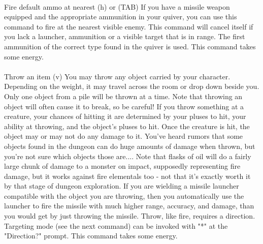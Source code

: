 \paragraph{}Fire default ammo at nearest (h) or (TAB) If you have a
missile weapon equipped and the appropriate ammunition in your quiver,
you can use this command to fire at the nearest visible enemy. This
command will cancel itself if you lack a launcher, ammunition or a
visible target that is in range. The first ammunition of the correct
type found in the quiver is used.  This command takes some energy.

\paragraph{}Throw an item (v) You may throw any object carried by your
character.  Depending on the weight, it may travel across the room or
drop down beside you.  Only one object from a pile will be thrown at a
time. Note that throwing an object will often cause it to break, so be
careful!  If you throw something at a creature, your chances of hitting
it are determined by your pluses to hit, your ability at throwing, and
the object's pluses to hit. Once the creature is hit, the object may or
may not do any damage to it. You've heard rumors that some objects found
in the dungeon can do huge amounts of damage when thrown, but you're not
sure which objects those are.... Note that flasks of oil will do a
fairly large chunk of damage to a monster on impact, supposedly
representing fire damage, but it works against fire elementals too - not
that it's exactly worth it by that stage of dungeon exploration. If you
are wielding a missile launcher compatible with the object you are
throwing, then you automatically use the launcher to fire the missile
with much higher range, accuracy, and damage, than you would get by just
throwing the missile. Throw, like fire, requires a direction. Targeting
mode (see the next command) can be invoked with "*" at the "Direction?"
prompt. This command takes some energy.

